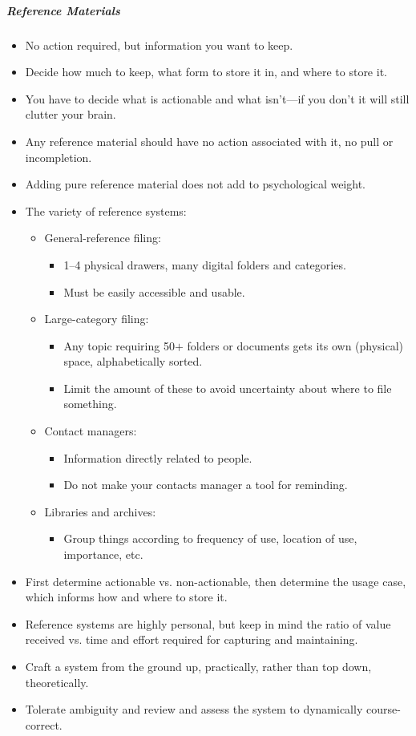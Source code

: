 \documentclass{article}
\begin{document}
\subparagraph{Reference Materials}

\begin{itemize}
  \item No action required, but information you want to keep.
  \item Decide how much to keep, what form to store it in, and where to store it.
  \item You have to decide what is actionable and what isn't---if you don't it will still clutter your brain.
  \item Any reference material should have no action associated with it, no pull or incompletion.
  \item Adding pure reference material does not add to psychological weight.
  \item The variety of reference systems:
  \begin{itemize}
    \item General-reference filing:
    \begin{itemize}
      \item 1--4 physical drawers, many digital folders and categories.
      \item Must be easily accessible and usable.
    \end{itemize}
    \item Large-category filing:
    \begin{itemize}
      \item Any topic requiring 50$+$ folders or documents gets its own (physical) space, alphabetically sorted.
      \item Limit the amount of these to avoid uncertainty about where to file something.
    \end{itemize}
    \item Contact managers:
    \begin{itemize}
      \item Information directly related to people.
      \item Do not make your contacts manager a tool for reminding.
    \end{itemize}
    \item Libraries and archives:
    \begin{itemize}
      \item Group things according to frequency of use, location of use, importance, etc.
    \end{itemize}
  \end{itemize}
  \item First determine actionable vs. non-actionable, then determine the usage case, which informs how and where to store it.
  \item Reference systems are highly personal, but keep in mind the ratio of value received vs. time and effort required for capturing and maintaining.
  \item Craft a system from the ground up, practically, rather than top down, theoretically.
  \item Tolerate ambiguity and review and assess the system to dynamically cour\-se-correct.
\end{itemize}
\end{document}
